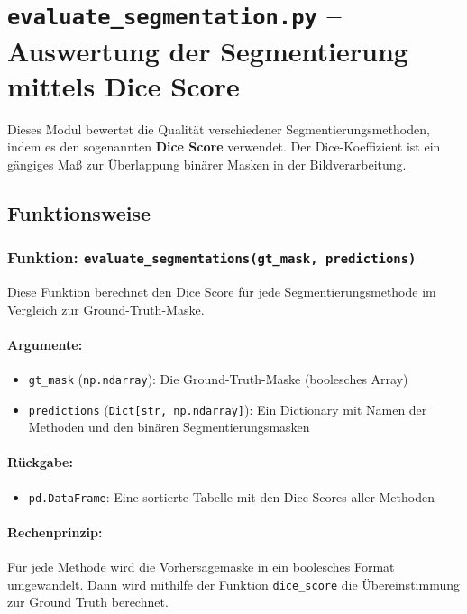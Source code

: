 \documentclass[a4paper,12pt]{article}
\begin{document}
\section*{ \texttt{evaluate\_segmentation.py} – Auswertung der Segmentierung mittels Dice Score}

Dieses Modul bewertet die Qualität verschiedener Segmentierungsmethoden, indem es den sogenannten \textbf{Dice Score} verwendet. Der Dice-Koeffizient ist ein gängiges Maß zur Überlappung binärer Masken in der Bildverarbeitung.

\subsection*{ Funktionsweise}

\subsubsection*{Funktion: \texttt{evaluate\_segmentations(gt\_mask, predictions)}}

Diese Funktion berechnet den Dice Score für jede Segmentierungsmethode im Vergleich zur Ground-Truth-Maske.

\paragraph{Argumente:}
\begin{itemize}
  \item \texttt{gt\_mask} (\texttt{np.ndarray}): Die Ground-Truth-Maske (boolesches Array)
  \item \texttt{predictions} (\texttt{Dict[str, np.ndarray]}): Ein Dictionary mit Namen der Methoden und den binären Segmentierungsmasken
\end{itemize}

\paragraph{Rückgabe:}
\begin{itemize}
  \item \texttt{pd.DataFrame}: Eine sortierte Tabelle mit den Dice Scores aller Methoden
\end{itemize}

\paragraph{Rechenprinzip:} Für jede Methode wird die Vorhersagemaske in ein boolesches Format umgewandelt. Dann wird mithilfe der Funktion \texttt{dice\_score} die Übereinstimmung zur Ground Truth berechnet.
\end{document}

